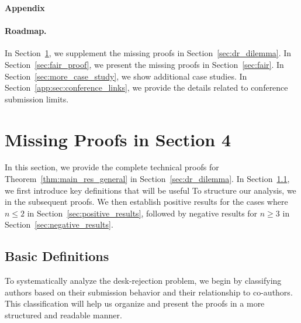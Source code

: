 \clearpage
\newpage
\begin{center}
    \textbf{\LARGE Appendix}
\end{center}

\paragraph{Roadmap.} In Section~\ref{sec:dilemma_proof}, we supplement the missing proofs in Section~\ref{sec:dr_dilemma}. In Section~\ref{sec:fair_proof}, we present the missing proofs in Section~\ref{sec:fair}. In Section~\ref{sec:more_case_study}, we show additional case studies. In Section~\ref{app:sec:conference_links}, we provide the details related to conference submission limits. 

\section{Missing Proofs in Section 4} \label{sec:dilemma_proof}

In this section, we provide the complete technical proofs for Theorem~\ref{thm:main_res_general} in Section~\ref{sec:dr_dilemma}. 
In Section~\ref{sec:dilemma_proof_defs}, we first introduce key definitions that will be useful 
To structure our analysis, we in the subsequent proofs. We then establish positive results for the cases where $n \leq 2$ in Section~\ref{sec:positive_results}, followed by negative results for $n \geq 3$ in Section~\ref{sec:negative_results}.


\subsection{Basic Definitions}\label{sec:dilemma_proof_defs}

To systematically analyze the desk-rejection problem, we begin by classifying authors based on their submission behavior and their relationship to co-authors. This classification will help us organize and present the proofs in a more structured and readable manner.

